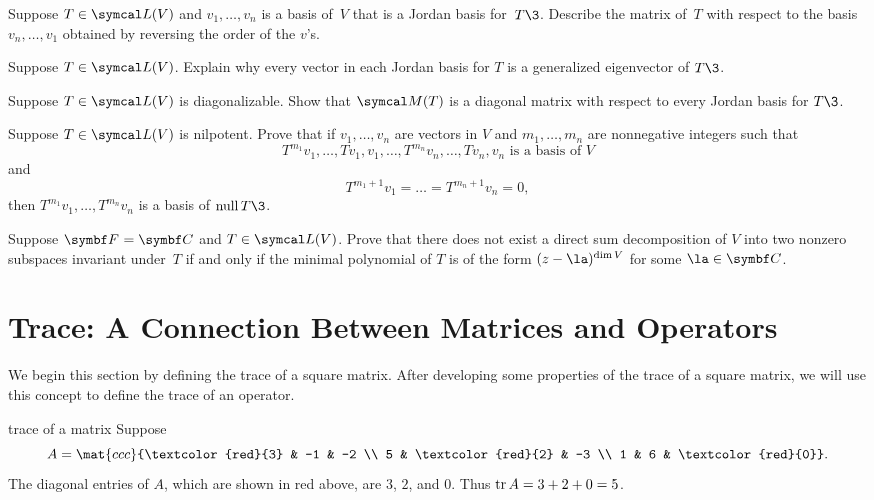 \begin{exercises}
\exercise
Suppose $T \in \L(V)$ and $v_1, \dots, v_n$ is a basis of~$V$ that is a Jordan
basis for~$T\3$. Describe the matrix of~$T$ with respect to the basis
$v_n, \dots, v_1$ obtained by reversing the order of the $v$'s.


\exercise
Suppose $T \in \L(V)$. Explain why every vector in each Jordan basis for $T$ is a generalized eigenvector of $T\3$.\label{8JorGenEig}


\exercise
Suppose $T \in \L(V)$ is diagonalizable. Show that $\M(T)$ is a diagonal matrix with respect to every Jordan basis for $T\3$.


\exercise
Suppose $T \in \L(V)$ is nilpotent. Prove that if $v_1, \dots, v_n$ are vectors in $V$ and $m_1, \dots, m_n$ are nonnegative integers such that
\[
T^{m_1}v_1, \dots, Tv_1, v_1, \dots, T^{m_n}v_n, \dots, Tv_n, v_n \text{ is a basis of } V
\]
and
\[
T^{m_1 + 1} v_1 = \dots = T^{m_n + 1} v_n = 0,
\]
then $T^{m_1}v_1, \dots, T^{m_n}v_n$ is a basis of $\ker T\3$.


\exercise
Suppose $\F{} = \C{}$ and $T \in \L(V)$.  Prove that there
does not exist a direct sum decomposition of $V$ into two nonzero subspaces
invariant under~$T$ if and only if the minimal polynomial of $T$ is of the form
$(z - \la)^{\dim V}$ for some $\la \in \C{}$.


\end{exercises}

\section{Trace: A Connection Between Matrices and Operators} \label{7trace}

We begin this section by defining the trace of a square matrix. After developing some properties of the trace of a square matrix, we will use this concept to define the trace of an operator.


\begin{example}{trace of a  matrix}
Suppose
\[
A = \mat{ccc}{\textcolor{red}{3} & -1 & -2 \\ 5 & \textcolor{red}{2} & -3 \\ 1 & 6 & \textcolor{red}{0}}.
\]
The diagonal entries of $A$, which are shown in red above, are $3$, $2$, and $0$. Thus $\operatorname{tr} A = 3 + 2 + 0 = 5$.
\end{example}

